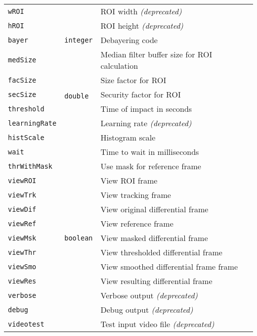 \documentclass[a4paper,11pt]{memoir}
\begin{document}
\begin{center}
\begin{longtable}{|m{}|m{}|m{}|}
\texttt{wROI} & & ROI width \textit{(deprecated)} \\ \cline{1-1} \cline{3-3}
\texttt{hROI} & & ROI height \textit{(deprecated)} \\ \hline
\texttt{bayer} & \texttt{integer} & Debayering code \\ \hline
\texttt{medSize} & \multirow{6}{*}{\texttt{double}} & Median filter buffer size for ROI calculation \\ \cline{1-1} \cline{3-3}
\texttt{facSize} & & Size factor for ROI \\ \cline{1-1} \cline{3-3}
\texttt{secSize} & & Security factor for ROI \\ \cline{1-1} \cline{3-3}
\texttt{threshold} & & Time of impact in seconds \\ \cline{1-1} \cline{3-3}
\texttt{learningRate} & & Learning rate \textit{(deprecated)} \\ \cline{1-1} \cline{3-3}
\texttt{histScale} &  & Histogram scale \\ \hline
\texttt{wait} & \multirow{17}{*}{\texttt{boolean}} & Time to wait in milliseconds \\ \cline{1-1} \cline{3-3}
\texttt{thrWithMask} & & Use mask for reference frame \\ \cline{1-1} \cline{3-3}
\texttt{viewROI} & & View ROI frame \\ \cline{1-1} \cline{3-3}
\texttt{viewTrk} &  & View tracking frame \\ \cline{1-1} \cline{3-3}
\texttt{viewDif} & & View original differential frame \\ \cline{1-1} \cline{3-3}
\texttt{viewRef} &  & View reference frame \\ \cline{1-1} \cline{3-3}
\texttt{viewMsk} &  & View masked differential frame \\ \cline{1-1} \cline{3-3}
\texttt{viewThr} & & View thresholded differential frame \\ \cline{1-1} \cline{3-3}
\texttt{viewSmo} & & View smoothed differential frame frame \\ \cline{1-1} \cline{3-3}
\texttt{viewRes} & & View resulting differential frame \\ \cline{1-1} \cline{3-3}
\texttt{verbose} & & Verbose output \textit{(deprecated)} \\ \cline{1-1} \cline{3-3}
\texttt{debug} & & Debug output \textit{(deprecated)} \\ \cline{1-1} \cline{3-3}
\texttt{videotest} & & Test input video file \textit{(deprecated)} \\ \cline{1-1} \cline{3-3}

\end{longtable}
\end{center}
\end{document}
